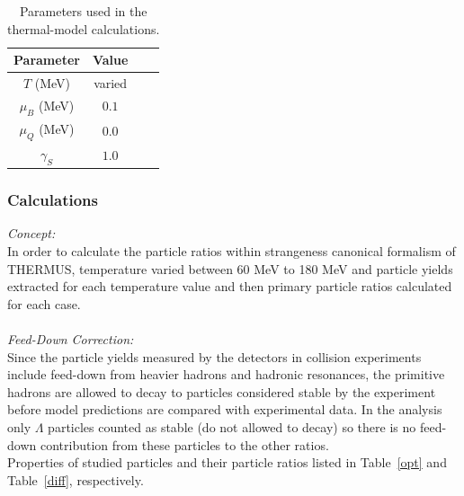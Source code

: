  \begin{center}
\begin{table}[h]
\centering
\caption{\label{jfonts} Parameters used in the thermal-model calculations.} 
 \begin{tabular}{@{}*{2}{cc}}
\hline
Parameter&Value\\
\hline
$T$ (MeV)&varied \\
$\mu_{B}$ (MeV)& $0.1$ \\ 
$\mu_{Q}$ (MeV)&$0.0$\\ 
$\gamma_{S}$&$1.0$\\ 
\hline
\end{tabular}
\end{table}
\end{center}
\newpage
\subsubsection{Calculations}
\textit{Concept:} \\In order to calculate the particle ratios within strangeness canonical formalism of THERMUS, temperature varied between 60 MeV to 180 MeV and particle yields extracted for each temperature value and then primary particle ratios calculated for each case. \\ \\
\textit{Feed-Down Correction:} \\Since the particle yields measured by the detectors in collision experiments include feed-down from heavier hadrons and hadronic resonances, the primitive hadrons are allowed to decay to particles considered stable by the experiment before model predictions are compared with experimental data. In the analysis only  $\Lambda$ particles counted as stable (do not allowed to decay) so there is no feed-down contribution from these particles to the other ratios.  \\ 

Properties of studied particles and their particle ratios listed in Table~\ref{opt} and Table~\ref{diff}, respectively. 

